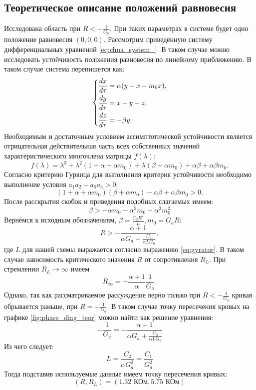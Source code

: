 \documentclass[12pt]{article}
\begin{document}
\subsection*{Теоретическое описание положений равновесия} 
Исследована область при $R < -\frac{1}{G_a}$. При таких параметрах в системе будет одно положение равновесия $(0, 0, 0)$. 
Рассмотрим приведённую систему дифференциальных уравнений \ref{eq:chua_system_}. В таком случае можно исследовать устойчивость положения 
равновесия по линейному приближению. В таком случае система перепишется как: 
\[
	\begin{dcases}
		\frac{dx}{d \tau} = \alpha(y - x - m_0 x), \\
		\frac{dy}{d \tau} = x - y + z, \\
		\frac{dz}{d \tau} = -\beta y. \\
	\end{dcases}
\]
Необходимым и достаточным условием ассимптотической устойчивости является отрицательная действительная часть всех собственных значений 
характеристического многочлена матрицы $f(\lambda)$: 
\[
	f(\lambda) = \lambda^3 + \lambda^2 (1 + \alpha + \alpha m_0) + \lambda (\beta + \alpha m_0) + \alpha \beta + \alpha \beta m_0.
\] 
Согласно критерию Гурвица для выполнения критерия устойчивости необходимо выполнение условия $a_1 a_2 - a_0 a_3 > 0$: 
\[
	(1 + \alpha + \alpha m_0) (\beta + \alpha m_0) - \alpha \beta + \alpha \beta m_0 > 0.
\]
После расскрытия скобок и приведения подобных слагаемых имеем: 
\[
	\beta > -\alpha m_0 - \alpha^2 m_0 - \alpha^2 m_0^2
\]
Вернёмся к исходным обозначениям, $\beta = \frac{C_2 R^2}{L}, m_0 = G_a R$: 
\begin{equation}
	R > -\frac{\alpha + 1}{\alpha G_a + \frac{C_2}{\alpha L G_a}},
	\label{eq:R_crit}
\end{equation}
где $L$ для нашей схемы выражается согласно выражению \ref{eq:gyrator}. В таком случае зависимость 
критического значения $R$ от сопротивления $R_L$. При стремлении $R_L \to \infty$ имеем 
\[
	R_\infty = -\frac{\alpha + 1}{\alpha} \frac{1}{G_a}.
\]  
Однако, так как рассматриваемое рассуждение верно только при $R < -\frac{1}{G_a}$ кривая обрывается раньше, при 
$R = -\frac{1}{G_a}$. В таком случае точку пересечения кривых на графике \ref{fig:phase_diag_teor} можно найти 
как решение уравнения: 
\[
	-\frac{1}{G_a} = -\frac{\alpha + 1}{\alpha G_a + \frac{C_2}{\alpha L G_a}}
\] 
Из чего следует: 
\[
	L = \frac{C_2}{\alpha G_a^2} = \frac{C_1}{G_a^2}
\]
Тогда подставив используемые данные имеем точку пересечения кривых: 
\[
	(R, R_L) = (1.32 \text{ КОм}, 5.75 \text{ КОм})
\]
\end{document}
